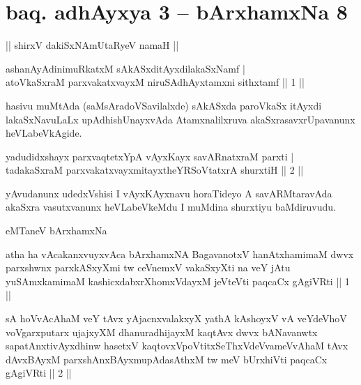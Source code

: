 
\section*{baq. adhAyxya 3 -- bArxhamxNa 8}

\begin{center}%
|| shirxV dakiSxNAmUtaRyeV namaH ||
\end{center}

\begin{shl}
ashanAyAdinimuRkatxM sAkASxditAyxdilakaSxNamf |\\
atoV\s kaSxraM parxvakatxvayxM niruSAdhAyxtamxni sithxtamf \hfill || 1 ||
\end{shl}

\begin{artha}
hasivu muMtAda (saMsAradoVSavilalxde) sAkASxda paroVkaSx itAyxdi lakaSxNavuLaLx upAdhishUnayxvAda Atamxnalilxruva akaSxrasavxrUpavanunx heVLabeVkAgide.
\end{artha}

\begin{shl}
yadudidxshayx parxvaqtetxYpA vAyxKayx savARnatxraM parxti |\\
tadakaSxraM parxvakatxvayxmitayxtheYRSoVtatxrA shurxtiH \hfill || 2 ||
\end{shl}

\begin{artha}
yAvudanunx udedxVshisi I vAyxKAyxnavu horaTideyo A savARMtaravAda akaSxra vasutxvanunx heVLabeVkeMdu I muMdina shurxtiyu baMdiruvudu.
\end{artha}

\begin{center}
eMTaneV bArxhamxNa
\end{center}

\begin{shl}
atha ha vAcakanxvuyxvAca bArxhamxNA BagavanotxV hanAtxhamimaM dwvx parxshwnx parxkASxyXmi tw ceVnemxV vakaSxyXti na veY jAtu yuSAmxkamimaM kashicxdabxrXhomxVdayxM jeVteVti paqcaCx gAgiVRti || 1 ||
\end{shl}

\begin{shl}
sA hoVvAcAhaM veY tAvx yAjacnxvalakxyX yathA kAshoyxV vA veYdeVhoV voVgarxputarx ujajxyXM dhanuradhijayxM kaqtAvx dwvx bANavanwtx sapatAnxtivAyxdhinw hasetxV kaqtovxVpoVtitxSeThxVdeVvameVvAhaM tAvx dAvxBAyxM parxshAnxBAyxmupAdasAthxM tw meV bUrxhiVti paqcaCx gAgiVRti || 2 ||
\end{shl}

